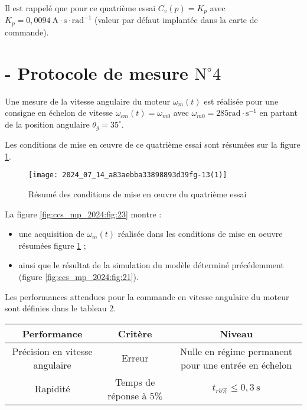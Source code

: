 Il est rappelé que pour ce quatrième essai $C_{v}(p)=K_{p}$ avec $K_{p}=0,0094 \mathrm{~A} \cdot \mathrm{s} \cdot \mathrm{rad}^{-1}$ (valeur par défaut implantée dans la carte de commande).

\section*{- Protocole de mesure $\mathrm{N}^{\circ} 4$}
Une mesure de la vitesse angulaire du moteur $\omega_{m}(t)$ est réalisée pour une consigne en échelon de vitesse $\omega_{c m}(t)=\omega_{m 0}$ avec $\omega_{m 0}=285 \mathrm{rad} \cdot \mathrm{s}^{-1}$ en partant de la position angulaire $\theta_{g}=35^{\circ}$.

Les conditions de mise en œuvre de ce quatrième essai sont résumées sur la figure \ref{fig:ccs_mp_2024:fig:22}.

\begin{figure}[!h]\centering
\texttt{[image: 2024\_07\_14\_a83aebba33898893d39fg-13(1)]}
\caption{\label{fig:ccs_mp_2024:fig:22}Résumé des conditions de mise en œuvre du quatrième essai}
\end{figure}
La figure \ref{fig:ccs_mp_2024:fig:23} montre :

\begin{itemize}
  \item une acquisition de $\omega_{m}(t)$ réalisée dans les conditions de mise en oeuvre résumées figure \ref{fig:ccs_mp_2024:fig:22} ;

  \item ainsi que le résultat de la simulation du modèle déterminé précédemment (figure \ref{fig:ccs_mp_2024:fig:21}).

\end{itemize}

Les performances attendues pour la commande en vitesse angulaire du moteur sont définies dans le tableau 2.

\begin{center}
\begin{tabular}{|c|c|c|}
\hline
Performance & Critère & Niveau \\
\hline
Précision en vitesse angulaire & Erreur & Nulle en régime permanent pour une entrée en échelon \\
\hline
Rapidité & Temps de réponse à $5 \%$ & $t_{r 5 \%} \leqslant 0,3 \mathrm{~s}$ \\
\hline
\end{tabular}
\end{center}

